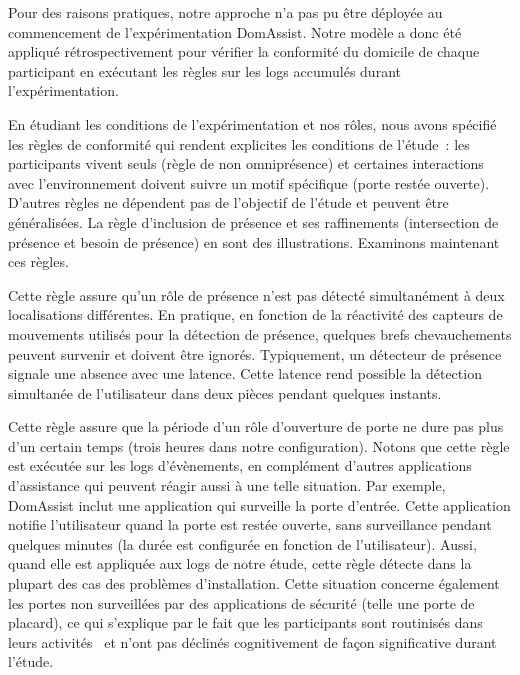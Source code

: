 Pour des raisons pratiques, notre approche n'a pas pu être déployée au commencement 
de l'expérimentation DomAssist. 
Notre modèle a donc été appliqué rétrospectivement pour 
vérifier la conformité du domicile de chaque participant en exécutant les règles 
sur les logs accumulés durant l'expérimentation.

En étudiant les conditions de l'expérimentation et nos rôles, nous avons 
spécifié les règles de conformité qui rendent explicites les conditions de 
l'étude~: les participants vivent seuls (règle de non omniprésence) 
et certaines interactions avec l'environnement doivent suivre un motif spécifique 
(porte restée ouverte). D'autres règles ne dépendent pas de l'objectif de l'étude 
et peuvent être généralisées. La règle d'inclusion de présence et ses 
raffinements (intersection de présence et besoin de présence) en sont des illustrations.
Examinons maintenant ces règles.

Cette règle assure qu'un rôle de présence n'est pas détecté simultanément à deux 
localisations différentes. En pratique, en fonction de la réactivité des capteurs 
de mouvements utilisés pour la détection de présence, quelques brefs chevauchements 
peuvent survenir et doivent être ignorés. Typiquement, un détecteur de présence 
signale une absence avec une latence. Cette latence rend possible la
détection simultanée  de l'utilisateur dans deux pièces pendant quelques instants.

Cette règle assure que la période d'un rôle d'ouverture de porte ne dure pas 
plus d'un certain temps (trois heures dans notre configuration). 
Notons que cette règle est exécutée sur les logs d'évènements, en complément
d'autres applications d'assistance qui peuvent réagir aussi 
à une telle situation. Par exemple, DomAssist inclut une application qui 
surveille la porte d'entrée. Cette application notifie l'utilisateur quand la porte est restée 
ouverte, sans surveillance pendant quelques minutes (la durée est configurée 
en fonction de l'utilisateur). Aussi, quand elle est appliquée aux logs 
de notre étude, cette règle détecte dans la plupart des cas des problèmes 
d'installation. 
Cette situation concerne également les portes non surveillées par des 
applications de sécurité (telle une porte de placard), ce qui s'explique par le fait que
les participants sont routinisés dans leurs
activités~ et n'ont pas déclinés  
cognitivement de façon significative durant l'étude.

